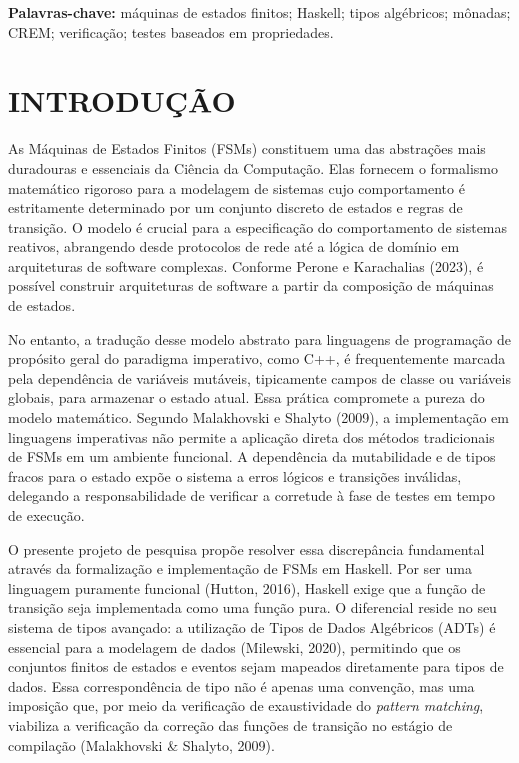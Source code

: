 \documentclass[12pt,a4paper]{article}
\begin{document}
\vspace{0.5cm}
\noindent\textbf{Palavras-chave:} máquinas de estados finitos; Haskell; tipos algébricos; mônadas; CREM; verificação; testes baseados em propriedades.


\newpage
\tableofcontents

\newpage
\section{INTRODUÇÃO}

As Máquinas de Estados Finitos (FSMs) constituem uma das abstrações mais duradouras e essenciais da Ciência da Computação. Elas fornecem o formalismo matemático rigoroso para a modelagem de sistemas cujo comportamento é estritamente determinado por um conjunto discreto de estados e regras de transição. O modelo é crucial para a especificação do comportamento de sistemas reativos, abrangendo desde protocolos de rede até a lógica de domínio em arquiteturas de software complexas. Conforme Perone e Karachalias (2023), é possível construir arquiteturas de software a partir da composição de máquinas de estados.

No entanto, a tradução desse modelo abstrato para linguagens de programação de propósito geral do paradigma imperativo, como C++, é frequentemente marcada pela dependência de variáveis mutáveis, tipicamente campos de classe ou variáveis globais, para armazenar o estado atual. Essa prática compromete a pureza do modelo matemático. Segundo Malakhovski e Shalyto (2009), a implementação em linguagens imperativas não permite a aplicação direta dos métodos tradicionais de FSMs em um ambiente funcional. A dependência da mutabilidade e de tipos fracos para o estado expõe o sistema a erros lógicos e transições inválidas, delegando a responsabilidade de verificar a corretude à fase de testes em tempo de execução.

O presente projeto de pesquisa propõe resolver essa discrepância fundamental através da formalização e implementação de FSMs em Haskell. Por ser uma linguagem puramente funcional (Hutton, 2016), Haskell exige que a função de transição seja implementada como uma função pura. O diferencial reside no seu sistema de tipos avançado: a utilização de Tipos de Dados Algébricos (ADTs) é essencial para a modelagem de dados (Milewski, 2020), permitindo que os conjuntos finitos de estados e eventos sejam mapeados diretamente para tipos de dados. Essa correspondência de tipo não é apenas uma convenção, mas uma imposição que, por meio da verificação de exaustividade do \textit{pattern matching}, viabiliza a verificação da correção das funções de transição no estágio de compilação (Malakhovski \& Shalyto, 2009).
\end{document}
